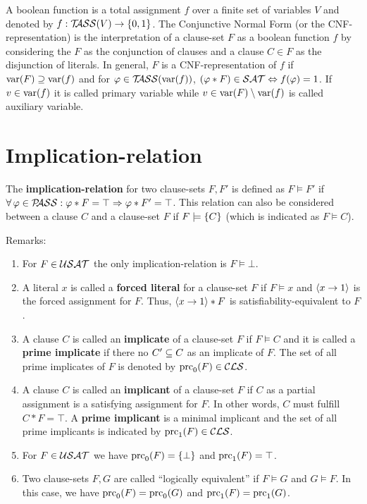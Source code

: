 \documentclass{report}
\begin{document}
A boolean function is a total assignment $f$ over a finite set of variables $V$ and denoted by $f:  \mathcal{T\hspace{-0.35em}ASS}(V) \rightarrow \{ 0,1 \}$. The Conjunctive Normal Form (or the CNF-representation) is the interpretation of a clause-set $F$ as a boolean function $f$ by considering the $F$ as the conjunction of clauses and a clause $C \in F$ as the disjunction of literals. In general, $F$ is a CNF-representation of $f$ if $\operatorname{var}(F) \supseteq \operatorname{var}(f)$ and for $\varphi \in \mathcal{T\hspace{-0.35em}ASS}(\operatorname{var}(f))$, $(\varphi * F) \in \mathcal{SAT} \Leftrightarrow f(\varphi) = 1$. If $v \in \operatorname{var}(f)$ it is called primary variable while $v \in \operatorname{var}(F) \setminus \operatorname{var}(f)$ is called auxiliary variable.

\section{Implication-relation}
\label{sec:imprel}

\begin{defi}\label{def:imp-rel}
The \textbf{implication-relation} for two clause-sets $F, F'$ is defined as $F \models F'$ if $\forall\, \varphi \in \mathcal{P\hspace{-0.32em}ASS} : \varphi * F = \top \Rightarrow \varphi * F' = \top$. This relation can also be considered between a clause $C$ and a clause-set $F$ if $F \models \{ C \}$ (which is indicated as $F \models C$).
\end{defi}
Remarks:
  \begin{enumerate}
  \item For  $F \in \mathcal{USAT}$ the only implication-relation is $F \models \bot$.
  \item A literal $x$ is called a \textbf{forced literal} for a clause-set $F$ if $F \models x$ and $\langle x \rightarrow 1 \rangle$ is the forced assignment for $F$. Thus,  $\langle x \rightarrow 1 \rangle * F$ is satisfiability-equivalent to $F$.
  \item A clause $C$ is called an \textbf{implicate} of a clause-set $F$ if $F \models C$ and it is called a \textbf{prime implicate} if there no $ C' \subseteq C$ as an implicate of $F$. The set of all prime implicates of $F$ is denoted by $\operatorname{prc}_0(F) \in \mathcal{CLS}$.
  \item A clause $C$ is called an \textbf{implicant} of a clause-set $F$ if $C$ as a partial assignment is a satisfying assignment for $F$. In other words, $C$ must fulfill $C * F=\top$. A \textbf{prime implicant} is a minimal implicant and the set of all prime implicants is indicated by $\operatorname{prc}_1(F) \in \mathcal{CLS}$. 
  \item For $F \in \mathcal{USAT}$ we have $\operatorname{prc}_0(F) = \{ \bot \}$ and $\operatorname{prc}_1(F) = \top$.
  \item Two clause-sets $F, G$ are called ``logically equivalent'' if $F \models G$ and $G \models F$. In this case, we have $\operatorname{prc}_0(F) = \operatorname{prc}_0(G)$ and $\operatorname{prc}_1(F) = \operatorname{prc}_1(G)$.
  \end{enumerate}
\end{document}
